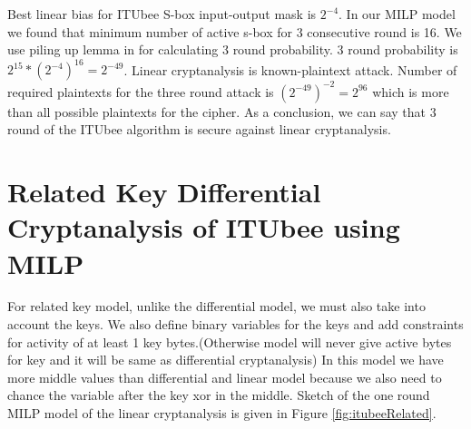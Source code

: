 Best linear bias for ITUbee S-box input-output mask is $2^{-4}$. In our MILP model we found that minimum number of active s-box for 3 consecutive round is 16. We use piling up lemma in \cite{matsui1993linear} for calculating 3 round probability. 3 round probability is $2^{15}*(2^{-4})^{16}=2^{-49}$. Linear cryptanalysis is known-plaintext attack. Number of required plaintexts for the three round attack is $(2^{-49})^{-2}= 2 ^{96}$ which is more than all possible plaintexts for the cipher. As a conclusion, we can say that 3 round of the ITUbee algorithm is secure against linear cryptanalysis.    

\section{Related Key Differential Cryptanalysis of ITUbee using MILP}

For related key model, unlike the differential model, we must also take into account the keys. We also define binary variables for the keys and add constraints for activity of at least 1 key bytes.(Otherwise model will never give active bytes for key and it will be same as differential cryptanalysis) In this model we have more middle values than differential and linear model because we also need to chance the variable after the key xor in the middle.
Sketch of the one round MILP model of the linear cryptanalysis is given in Figure \ref{fig:itubeeRelated}. 


